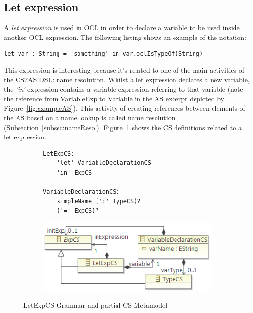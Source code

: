 \documentclass{llncs}
\begin{document}
\subsection{Let expression}

A \textit{let expression} is used in OCL in order to declare a variable to be used inside another OCL expression. The following listing shows an example of the notation:

\begin{lstlisting}[label=lst:letExpExample, language=OCL]
let var : String = 'something' in var.oclIsTypeOf(String)
\end{lstlisting}

This expression is interesting because it's related to one of the main activities of the CS2AS DSL: name resolution. Whilst a let expression declares a new variable, the \emph{'in'} expression contains a variable expression referring to that variable (note the reference from VariableExp to Variable in the AS excerpt depicted by Figure~\ref{fig:exampleAS}). This activity of creating  references between elements of the AS based on a name lookup is called name resolution (Subsection~\ref{subsec:nameReso}). Figure~\ref{fig:LetExpCS} shows the CS definitions related to a let expression.

\begin{figure}[htbp]
\centering
\begin{subfigure}{0.5\textwidth}
  \centering
  \begin{lstlisting}[label=lst:letExpEBNF, language=Xtext]
LetExpCS:
    'let' VariableDeclarationCS 
  	'in' ExpCS
  	
VariableDeclarationCS:
    simpleName (':' TypeCS)?
    ('=' ExpCS)?	
  \end{lstlisting} 
\end{subfigure}%
\begin{subfigure}{0.5\textwidth}
  \centering
  \includegraphics[scale=0.75]{images/LetExpCS.png}
\end{subfigure}
\caption{LetExpCS Grammar and partial CS Metamodel}
\label{fig:LetExpCS}
\end{figure}
\end{document}
